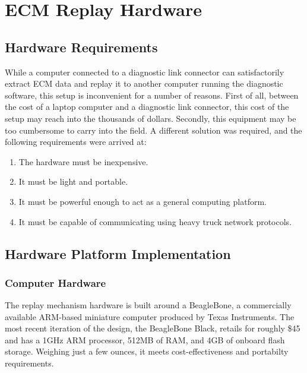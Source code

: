 \chapter{ECM Replay Hardware}


\section{Hardware Requirements}

While a computer connected to a diagnostic link connector can satisfactorily extract ECM data and replay
it to another computer running the diagnostic software, this setup is inconvenient for a number of reasons.
First of all, between the cost of a laptop computer and a diagnostic link connector, this cost of the setup
may reach into the thousands of dollars. Secondly, this equipment may be too cumbersome to carry into the field.
A different solution was required, and the following requirements were arrived at:

\begin{enumerate}
  \item The hardware must be inexpensive.
  \item It must be light and portable.
  \item It must be powerful enough to act as a general computing platform.
  \item It must be capable of communicating using heavy truck network protocols.
\end{enumerate}

\section{Hardware Platform Implementation}

\subsection{Computer Hardware}

The replay mechanism hardware is built around a BeagleBone, a commercially available ARM-based miniature computer produced
by Texas Instruments. The most recent iteration of the design, the BeagleBone Black, retails for roughly \$45 and has a 1GHz ARM
processor, 512MB of RAM, and 4GB of onboard flash storage. Weighing just a few ounces, it meets cost-effectiveness and portabilty
requirements.

